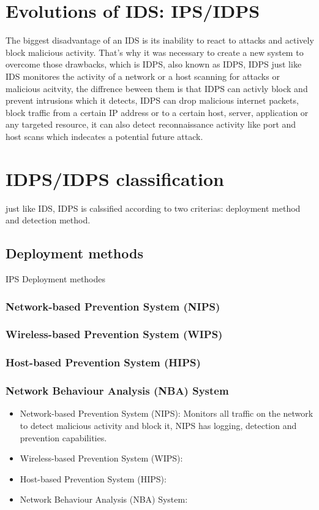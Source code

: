 \section{Evolutions of IDS: IPS/IDPS}
The biggest disadvantage of an IDS is its inability to react to attacks and actively block malicious activity. That's why it was necessary to create a new system to overcome those drawbacks, which is IDPS, also known as IDPS, IDPS just like IDS monitores the activity of a network or a host scanning for attacks or malicious acitvity, the diffrence beween them is that IDPS can activly block and prevent intrusions which it detects, IDPS can drop malicious internet packets, block traffic from a certain IP address or to a certain host, server, application or any targeted resource, it can also detect reconnaissance activity like port and host scans which indecates a potential future attack. \cite{NIST-IDPS}



\section{IDPS/IDPS classification}
just like IDS, IDPS is calssified according to two criterias: deployment method and detection method.

\subsection{Deployment methods}
IPS Deployment methodes
\subsubsection{Network-based Prevention System (NIPS)}
\subsubsection{Wireless-based Prevention System (WIPS)}
\subsubsection{Host-based Prevention System (HIPS)}
\subsubsection{Network Behaviour Analysis (NBA) System}
\begin{itemize}
	\item Network-based Prevention System (NIPS): Monitors all traffic on the network to detect malicious activity and block it, NIPS has logging, detection and prevention capabilities.
	\item Wireless-based Prevention System (WIPS): 
	\item Host-based Prevention System (HIPS): 
	\item Network Behaviour Analysis (NBA) System: 
\end{itemize}


